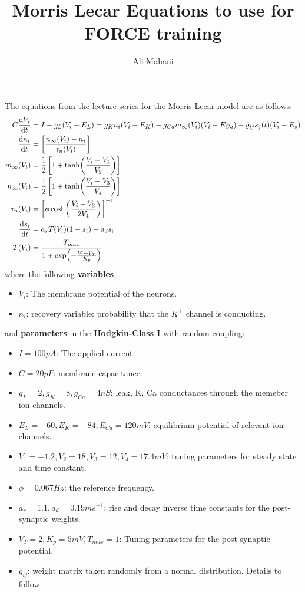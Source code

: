\documentclass[12pt, letter]{article}
\author{Ali Mahani}
\title{Morris Lecar Equations to use for FORCE training}
\begin{document}
	\maketitle
	
	The equations from the lecture series for the Morris Lecar model are as follows:
	\begin{equation}
		\begin{aligned}
			C\dv{V_i}{t} &= I - g_L(V_i - E_L) = g_K n_i (V_i - E_K) - g_{Ca} m_\infty(V_i) (V_i - E_{Ca}) - \bar{g}_{ij} s_j(t) (V_i - E_s)\\
			\dv{n_i}{t} &= \left[\frac{n_\infty(V_i) - n_i}{\tau_n(V_i)}\right]\\
			m_\infty(V_i) &= \frac{1}{2} \left[1 + \tanh(\frac{V_i - V_1}{V_2})\right]\\
			n_\infty(V_i) &= \frac{1}{2} \left[1 + \tanh(\frac{V_i - V_3}{V_4})\right]\\
			\tau_n(V_i) &= \left[\phi \cosh(\frac{V_i - V_3}{2 V_4})\right]^{-1}\\
			\dv{s_i}{t} &= a_r T(V_i)(1 - s_i) - a_d s_i\\
			T(V_i) &= \frac{T_{max}}{1 + \exp(-\frac{V_i - V_T}{K_p})}					
		\end{aligned}
	\end{equation}
	where the following \textbf{variables}
	\begin{itemize}
		\item $V_i$: The membrane potential of the neurons.
		\item $n_i$: recovery variable: probability that the $K^+$ channel is conducting. 
	\end{itemize}
	and \textbf{parameters} in the \textbf{Hodgkin-Class I} with random coupling:
	\begin{itemize}
		\item $I = 100 pA$: The applied current.
		\item $C = 20 pF$: membrane capacitance.
		\item $g_L = 2, g_K = 8, g_{Ca} = 4 nS$: leak, K, Ca conductances through the memeber ion channels.
		\item $E_L = -60, E_K = -84, E_{Ca} = 120 mV$: equilibrium potential of relevant ion channels.
		\item $V_1=-1.2, V_2 = 18, V_3 = 12, V_4 = 17.4 mV$: tuning parameters for steady state and time constant.
		\item $\phi = 0.067 Hz$: the reference frequency.
		\item $a_r = 1.1, a_d = 0.19 ms^{-1}$: rise and decay inverse time constants for the post-synaptic weights.
		\item $V_T = 2, K_p = 5 mV, T_{max} = 1$: Tuning parameters for the post-synaptic potential.
		\item $\bar{g}_{ij}$: weight matrix taken randomly from a normal distribution. Details to follow.
	\end{itemize}
	
\end{document}
